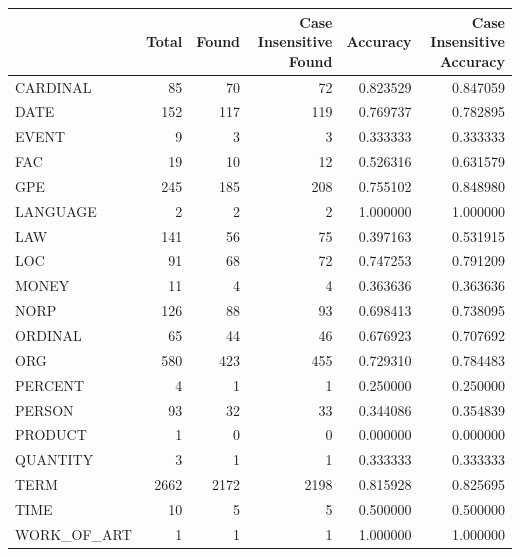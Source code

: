 \begin{tabular}{lrrrrr}
\toprule
 & Total & Found & Case Insensitive Found & Accuracy & Case Insensitive Accuracy \\
\midrule
CARDINAL & 85 & 70 & 72 & 0.823529 & 0.847059 \\
DATE & 152 & 117 & 119 & 0.769737 & 0.782895 \\
EVENT & 9 & 3 & 3 & 0.333333 & 0.333333 \\
FAC & 19 & 10 & 12 & 0.526316 & 0.631579 \\
GPE & 245 & 185 & 208 & 0.755102 & 0.848980 \\
LANGUAGE & 2 & 2 & 2 & 1.000000 & 1.000000 \\
LAW & 141 & 56 & 75 & 0.397163 & 0.531915 \\
LOC & 91 & 68 & 72 & 0.747253 & 0.791209 \\
MONEY & 11 & 4 & 4 & 0.363636 & 0.363636 \\
NORP & 126 & 88 & 93 & 0.698413 & 0.738095 \\
ORDINAL & 65 & 44 & 46 & 0.676923 & 0.707692 \\
ORG & 580 & 423 & 455 & 0.729310 & 0.784483 \\
PERCENT & 4 & 1 & 1 & 0.250000 & 0.250000 \\
PERSON & 93 & 32 & 33 & 0.344086 & 0.354839 \\
PRODUCT & 1 & 0 & 0 & 0.000000 & 0.000000 \\
QUANTITY & 3 & 1 & 1 & 0.333333 & 0.333333 \\
TERM & 2662 & 2172 & 2198 & 0.815928 & 0.825695 \\
TIME & 10 & 5 & 5 & 0.500000 & 0.500000 \\
WORK_OF_ART & 1 & 1 & 1 & 1.000000 & 1.000000 \\
\bottomrule
\end{tabular}
